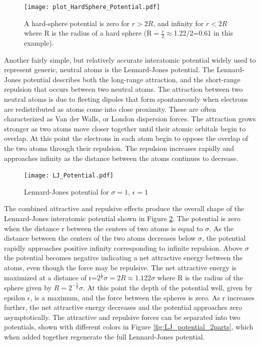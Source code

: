\documentclass[double,12pt]{beavtex}
\begin{document}
\begin{figure}
    \centering
    \texttt{[image: plot\_HardSphere\_Potential.pdf]}
    \caption{A hard-sphere potential is zero for $r>2R$, and infinity 
    for $r<{2R}$ where R is the radius of a hard sphere 
    (R$=\frac{r}{2}\approx$1.22/2=0.61 in this example).}
    \label{fig:HardSphere_potential}
  \end{figure}

Another fairly simple, but relatively accurate interatomic potential widely 
used to represent generic, neutral atoms is the Lennard-Jones potential. 
The Lennard-Jones potential describes both the long-range attraction, 
and the short-range repulsion that occurs between two neutral atoms. 
The attraction between two neutral atoms is due to fleeting dipoles that 
form spontaneously when electrons are redistributed as atoms come into 
close proximity. These are often characterized as Van der Walls, or London 
dispersion forces. The attraction grows stronger as two atoms move closer 
together until their atomic orbitals begin to overlap. 
At this point the electrons in each atom begin to oppose the overlap of 
the two atoms through their repulsion. The repulsion increases rapidly and 
approaches infinity as the distance between the atoms continues to decrease.  
 
\begin{figure}
    \centering
    \texttt{[image: LJ\_Potential.pdf]}
    \caption{Lennard-Jones potential for $\sigma=1$, $\epsilon=1$}
    \label{fig:LJ_potential}
  \end{figure}

The combined attractive and repulsive effects produce the overall shape of 
the Lennard-Jones interatomic potential shown in Figure \ref{fig:LJ_potential}. 
The potential is zero when the distance r between the centers of two atoms 
is equal to $\sigma$. 
As the distance 
between the centers of the two atoms decreases below $\sigma$, the potential 
rapidly approaches positive infinity corresponding to infinite repulsion. 
Above $\sigma$ the potential becomes negative indicating a net attractive energy 
between the atoms, even though the force may be repulsive. 
The net attractive energy is maximized at a distance of 
r=$2^\frac{1}{6}\sigma=2R\approx{1.122}\sigma$ where R is the radius of 
the sphere given by $R={2^{-\frac{5}{6}}}\sigma$. At this point the depth of
the potential well, given by epsilon $\epsilon$, is a maximum, and the force
between the spheres is zero. As r increases 
further, the net attractive energy decreases and the potential approaches zero
asymptotically. The attractive and repulsive forces can be separated into two
potentials, shown with different colors in Figure \ref{fig:LJ_potential_2parts}, 
which when added together regenerate the full Lennard-Jones potential. 
\end{document}

